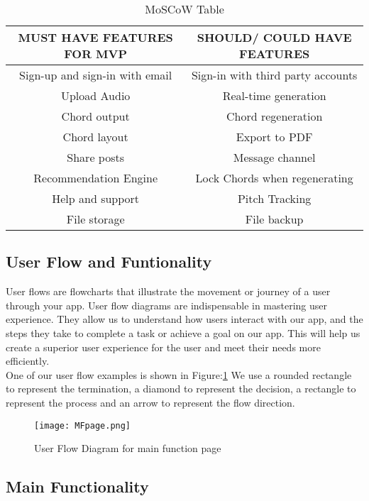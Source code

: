 \begin{table}[ht]
\centering
\begin{tabular}{ |c|c| } 
 \hline
\textbf{MUST HAVE FEATURES FOR MVP} & \textbf{SHOULD/ COULD HAVE FEATURES}\\ 
 \hline
 Sign-up and sign-in with email & Sign-in with third party accounts \\ 
 \hline
 Upload Audio & Real-time generation \\ 
 \hline
 Chord output & Chord regeneration \\ 
 \hline
 Chord layout &  Export to PDF \\ 
 \hline
 Share posts & Message channel \\ 
 \hline
 Recommendation Engine &  Lock Chords when regenerating\\ 
 \hline
 Help and support &  Pitch Tracking\\ 
 \hline
 File storage& File backup \\ 
 \hline
 \end{tabular}
 \caption{MoSCoW Table}
 \centering
 \label{moscow}
 \end{table}
 
 \subsection{User Flow and Funtionality}
User flows are flowcharts that illustrate the movement or journey of a user through your app. User flow diagrams are indispensable in mastering user experience. 
They allow us to understand how users interact with our app, and the steps they take to complete a task or achieve a goal on our app. This will help us create a superior user experience for the user and meet their needs more efficiently.  
\\One of our user flow examples is shown in Figure:\ref{flowchartmain}
We use a rounded rectangle to represent the termination, a diamond to represent the decision, a rectangle to represent the process and an arrow to represent the flow direction.

\begin{figure}[ht]
\centering
\texttt{[image: MFpage.png]}
\caption{User Flow Diagram for main function page}
\label{flowchartmain}
\end{figure}


\subsection*{Main Functionality}

